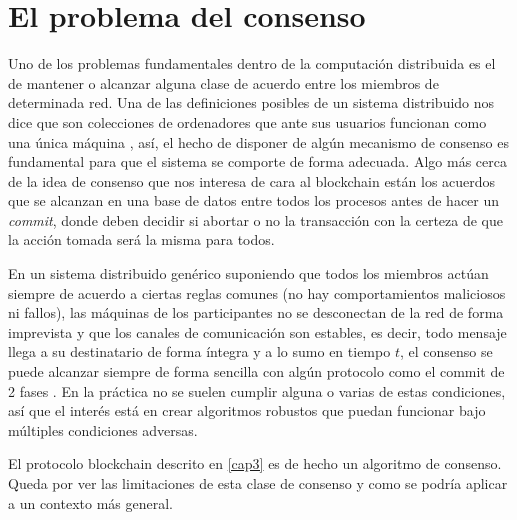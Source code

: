 \cleardoublepage

\chapter{El problema del consenso}
\label{cap4}

Uno de los problemas fundamentales dentro de la computación distribuida es el de mantener o alcanzar alguna clase de acuerdo entre los miembros de determinada red. Una de las definiciones posibles de un sistema distribuido nos dice que son colecciones de ordenadores que ante sus usuarios funcionan como una única máquina \citep{distributed_system}, así, el hecho de disponer de algún mecanismo de consenso es fundamental para que el sistema se comporte de forma adecuada. Algo más cerca de la idea de consenso que nos interesa de cara al blockchain están los acuerdos que se alcanzan en una base de datos entre todos los procesos antes de hacer un \textit{commit}, donde deben decidir si abortar o no la transacción con la certeza de que la acción tomada será la misma para todos.

En un sistema distribuido genérico suponiendo que todos los miembros actúan siempre de acuerdo a ciertas reglas comunes (no hay comportamientos maliciosos ni fallos), las máquinas de los participantes no se desconectan de la red de forma imprevista y que los canales de comunicación son estables, es decir, todo mensaje llega a su destinatario de forma íntegra y a lo sumo en tiempo $t$, el consenso se puede alcanzar siempre de forma sencilla con algún protocolo como el commit de 2 fases \citep{2commit}. En la práctica no se suelen cumplir alguna o varias de estas condiciones, así que el interés está en crear algoritmos robustos que puedan funcionar bajo múltiples condiciones adversas.

El protocolo blockchain descrito en \ref{cap3} es de hecho un algoritmo de consenso. Queda por ver las limitaciones de esta clase de consenso y como se podría aplicar a un contexto más general.
